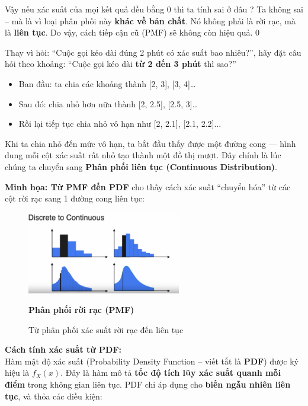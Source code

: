 \documentclass[11pt]{article}
\begin{document}
 Vậy nếu xác suất của mọi kết quả đều bằng 0 thì ta tính sai ở đâu ? Ta không sai – mà là vì loại phân phối này \textbf{khác về bản chất}. Nó không phải là rời rạc, mà là \textbf{liên tục}. Do vậy, cách tiếp cận cũ (PMF) sẽ không còn hiệu quả.
0
\vspace{1em}

Thay vì hỏi: “Cuộc gọi kéo dài đúng 2 phút có xác suất bao nhiêu?”, hãy đặt câu hỏi theo khoảng: “Cuộc gọi kéo dài \textbf{từ 2 đến 3 phút} thì sao?”

\begin{itemize}
    \item Ban đầu: ta chia các khoảng thành [2, 3], [3, 4]…
    \item Sau đó: chia nhỏ hơn nữa thành [2, 2.5], [2.5, 3]…
    \item Rồi lại tiếp tục chia nhỏ vô hạn như [2, 2.1], [2.1, 2.2]...
\end{itemize}

Khi ta chia nhỏ đến mức vô hạn, ta bắt đầu thấy được một đường cong — hình dung mỗi cột xác suất rất nhỏ tạo thành một đồ thị mượt. Đây chính là lúc chúng ta chuyển sang \textbf{Phân phối liên tục (Continuous Distribution)}. 

\newpage

\textbf{Minh họa: Từ PMF đến PDF} cho thấy cách xác suất “chuyển hóa” từ các cột rời rạc sang 1 đường cong liên tục:
\begin{figure}[H]
    \centering %
    \includegraphics[width=0.6\textwidth]{images/dis2con.png} %
    \caption*{\textbf{Phân phối rời rạc (PMF)}} %
    \caption{Từ phân phối xác suất rời rạc đến liên tục} 
\end{figure}

\vspace{1em}

\textbf{Cách tính xác suất từ PDF:} \\

Hàm mật độ xác suất (Probability Density Function – viết tắt là \textbf{PDF}) được ký hiệu là $f_X(x)$. Đây là hàm mô tả \textbf{tốc độ tích lũy xác suất quanh mỗi điểm} trong không gian liên tục. PDF chỉ áp dụng cho \textbf{biến ngẫu nhiên liên tục}, và thỏa các điều kiện: \\
\end{document}
